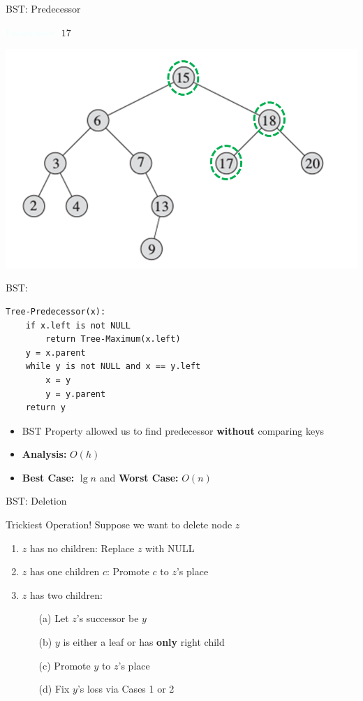 \documentclass{beamer}
\newcommand{\tblue}[1]{{\Large {\textcolor{azure}{#1}}}}
\begin{document}
\begin{frame}{BST: Predecessor}

\tblue{Predecessor:} $17$
    \begin{center}
        \includegraphics[scale=0.5]{bstPredecessor4.png}
    \end{center}
\end{frame}


\begin{frame}[fragile]{BST: }
\begin{verbatim}
Tree-Predecessor(x):
    if x.left is not NULL
        return Tree-Maximum(x.left)
    y = x.parent
    while y is not NULL and x == y.left
        x = y
        y = y.parent
    return y
\end{verbatim}
    \begin{itemize}
        \item BST Property allowed us to find predecessor {\bf without} comparing keys
        \item {\bf Analysis:} $O(h)$ 
        \item {\bf Best Case:} $\lg n$ and {\bf Worst Case:} $O(n)$
    \end{itemize}
\end{frame}

\begin{frame}{BST: Deletion}

    Trickiest Operation! Suppose we want to delete node $z$
    \begin{enumerate}
        \item $z$ has no children: Replace $z$ with NULL
        \item $z$ has one children $c$: Promote $c$ to $z$'s place
        \item $z$ has two children: 
        \begin{enumerate}
            \item[(a)] Let $z$'s successor be $y$
            \item[(b)] $y$ is either a leaf or has {\bf only} right child
            \item[(c)] Promote $y$ to $z$'s place
            \item[(d)] Fix $y$'s loss via Cases 1 or 2
        \end{enumerate}
    \end{enumerate}
\end{frame}
\end{document}
